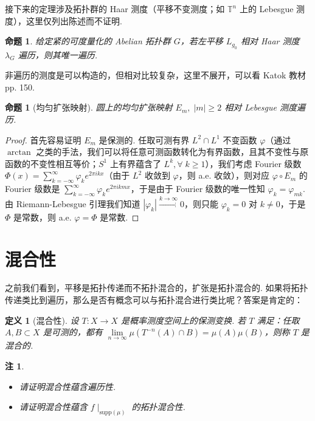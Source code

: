 \documentclass[11pt, a4paper, oneside]{ctexart}
\newtheorem{definition}[theorem]{定义}
\newtheorem{proposition}[theorem]{命题}
\newtheorem{remark}[theorem]{注}
\newcommand{\T}{\mathbb{T}}
\newcommand{\supp}{\mathrm{supp}}
\newcommand{\abs}[1]{\left|{#1}\right|}
\begin{document}
    接下来的定理涉及拓扑群的 Haar 测度（平移不变测度；如 $\T^n$ 上的 Lebesgue 测度），这里仅列出陈述而不证明.
    \begin{proposition}
        给定紧的可度量化的 Abelian 拓扑群 $G$，若左平移 $L_{g_0}$ 相对 Haar 测度 $\lambda_G$ 遍历，则其唯一遍历.
    \end{proposition}

    非遍历的测度是可以构造的，但相对比较复杂，这里不展开，可以看 Katok 教材 pp. 150.

    \begin{proposition}[均匀扩张映射]
        圆上的均匀扩张映射 $E_m,\; \abs{m}\geq 2$ 相对 Lebesgue 测度遍历.
    \end{proposition}
    \begin{proof}
        首先容易证明 $E_m$ 是保测的. 任取可测有界 $L^2\cap L^1$ 不变函数 $\varphi$（通过 $\arctan$ 之类的手法，我们可以将任意可测函数转化为有界函数，且其不变性与原函数的不变性相互等价；$S^1$ 上有界蕴含了 $L^k,\forall\; k\geq 1$），我们考虑 Fourier 级数 $\Phi(x)=\sum\limits_{k=-\infty}^{\infty}\varphi_k e^{2\pi ikx}$（由于 $L^2$ 收敛到 $\varphi$，则 a.e. 收敛），则对应 $\varphi\circ E_m$ 的 Fourier 级数是 $\sum\limits_{k=-\infty}^{\infty}\varphi_k e^{2\pi ikmx}$，于是由于 Fourier 级数的唯一性知 $\varphi_k=\varphi_{mk}$. 由 Riemann-Lebesgue 引理我们知道 $\abs{\varphi_k}\stackrel{k\to\infty}{\to}0$，则只能 $\varphi_k=0$ 对 $k\neq 0$，于是 $\Phi$ 是常数，则 a.e. $\varphi=\Phi$ 是常数.
    \end{proof}

    \section{混合性}
    之前我们看到，平移是拓扑传递而不拓扑混合的，扩张是拓扑混合的. 如果将拓扑传递类比到遍历，那么是否有概念可以与拓扑混合进行类比呢？答案是肯定的：
    \begin{definition}[混合性]
        设 $T:X\to X$ 是概率测度空间上的保测变换. 若 $T$ 满足：任取 $A,B\subset X$ 是可测的，都有 $\lim\limits_{n\to\infty}\mu(T^{-n}(A)\cap B)=\mu(A)\mu(B)$，则称 $T$ 是混合的.
    \end{definition}
    \begin{remark}
        \begin{itemize}
            \item 请证明混合性蕴含遍历性.
            \item 请证明混合性蕴含 $f\mid_{\supp(\mu)}$ 的拓扑混合性.
        \end{itemize}
    \end{remark}
\end{document}
